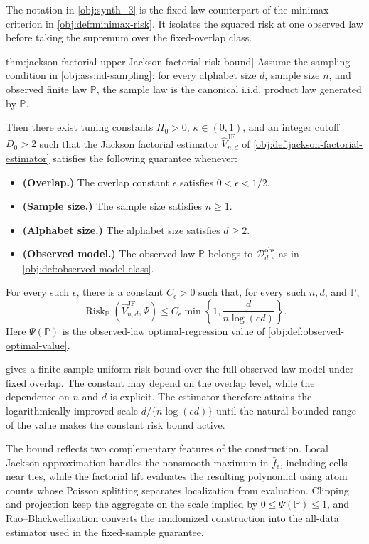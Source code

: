 The notation in \cref{obj:synth_3} is the fixed-law counterpart of the minimax criterion in \cref{obj:def:minimax-risk}. It isolates the squared risk at one observed law before taking the supremum over the fixed-overlap class.

\begin{theoremv}{thm:jackson-factorial-upper}[Jackson factorial risk bound]
Assume the sampling condition in \cref{obj:ass:iid-sampling}: for every alphabet size \(d\), sample size \(n\), and observed finite law \(\mathbb P\), the sample law is the canonical i.i.d. product law generated by \(\mathbb P\).

Then there exist tuning constants \(H_0>0\), \(\kappa\in(0,1)\), and an integer cutoff \(D_0>2\) such that the Jackson factorial estimator \(\widehat V_{n,d}^{\mathrm{JF}}\) of \cref{obj:def:jackson-factorial-estimator} satisfies the following guarantee whenever:
\begin{itemize}
\item \textbf{(Overlap.)} The overlap constant \(\epsilon\) satisfies \(0<\epsilon<1/2\).
\item \textbf{(Sample size.)} The sample size satisfies \(n\ge 1\).
\item \textbf{(Alphabet size.)} The alphabet size satisfies \(d\ge 2\).
\item \textbf{(Observed model.)} The observed law \(\mathbb P\) belongs to \(\mathcal D_{d,\epsilon}^{\mathrm{obs}}\) as in \cref{obj:def:observed-model-class}.
\end{itemize}
For every such \(\epsilon\), there is a constant \(C_\epsilon>0\) such that, for every such \(n,d\), and \(\mathbb P\),
\[
\operatorname{Risk}_{\mathbb P}
\left(\widehat V_{n,d}^{\mathrm{JF}},\Psi\right)
\le
C_\epsilon \min\left\{1,\frac{d}{n\log(ed)}\right\}.
\]
Here \(\Psi(\mathbb P)\) is the observed-law optimal-regression value of \cref{obj:def:observed-optimal-value}.
\end{theoremv}

 gives a finite-sample uniform risk bound over the full observed-law model under fixed overlap. The constant  may depend on the overlap level, while the dependence on \(n\) and \(d\) is explicit. The estimator therefore attains the logarithmically improved scale \(d/\{n\log(ed)\}\) until the natural bounded range of the value makes the constant risk bound active.

The bound reflects two complementary features of the construction. Local Jackson approximation handles the nonsmooth maximum in \(\bar f_\epsilon\), including cells near ties, while the factorial lift evaluates the resulting polynomial using atom counts whose Poisson splitting separates localization from evaluation. Clipping and projection keep the aggregate on the scale implied by \(0\leq\Psi(\mathbb P)\leq1\), and Rao--Blackwellization converts the randomized construction into the all-data estimator used in the fixed-sample guarantee.
